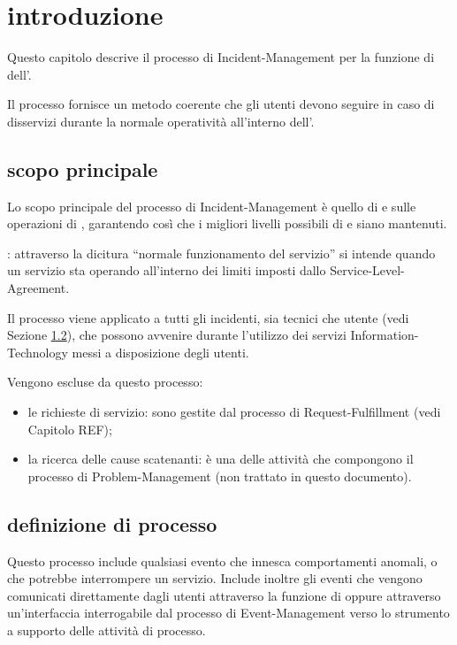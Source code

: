 %
%
\section[Introduzione]{introduzione}
\label{im-introduction}
Questo capitolo descrive il processo di \acf{Incident-Management} per la funzione di  dell'\entity{}.

Il processo fornisce un metodo coerente che gli utenti devono seguire in caso di disservizi durante la normale operatività all'interno dell'\entity{}.

\subsection[Scopo principale]{scopo principale}
\label{im-introduction-scope}
Lo scopo principale del processo di \ac{Incident-Management} è quello di  e  sulle operazioni di , garantendo così che i migliori livelli possibili di  e  siano mantenuti.

: attraverso la dicitura ``normale funzionamento del servizio'' si intende quando un servizio sta operando all'interno dei limiti imposti dallo \ac{Service-Level-Agreement}.

Il processo viene applicato a tutti gli incidenti, sia tecnici che utente (vedi Sezione \ref{im-introduction-definition}), che possono avvenire durante l'utilizzo dei servizi \acs{Information-Technology} messi a disposizione degli utenti.

Vengono escluse da questo processo:

\begin{itemize}
\item{le richieste di servizio: sono gestite dal processo di \acf{Request-Fulfillment} (vedi Capitolo REF);}
\item{la ricerca delle cause scatenanti: è una delle attività che compongono il processo di \acf{Problem-Management} (non trattato in questo documento).}
\end{itemize}

\subsection[Definizione di processo]{definizione di processo}
\label{im-introduction-definition}
Questo processo include qualsiasi evento che innesca comportamenti anomali, o che potrebbe interrompere un servizio. Include inoltre gli eventi che vengono comunicati direttamente dagli utenti attraverso la funzione di  oppure attraverso un'interfaccia interrogabile dal processo di \ac{Event-Management} verso lo strumento a supporto delle attività di processo.

